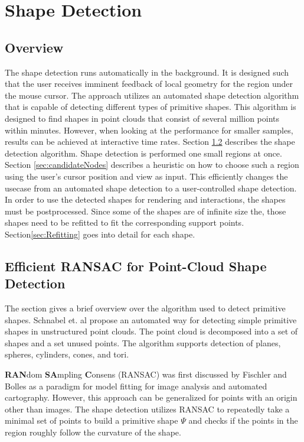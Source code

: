 \chapter{Shape Detection}
\section{Overview}
The shape detection runs automatically in the background. It is designed such that the user receives imminent feedback of local geometry for the region under the mouse cursor. The approach utilizes an automated shape detection algorithm that is capable of detecting different types of primitive shapes. This algorithm is designed to find shapes in point clouds that consist of several million points within minutes. However, when looking at the performance for smaller samples, results can be achieved at interactive time rates. 
Section \ref{sec:schnabel} describes the shape detection algorithm. 
Shape detection is performed one small regions at once. Section \ref{sec:candidateNodes} describes a heuristic on how to choose such a region using the user's cursor position and view as input. This efficiently changes the usecase from an automated shape detection to a user-controlled shape detection. 
In order to use the detected shapes for rendering and interactions, the shapes must be postprocessed. 
Since some of the shapes are of infinite size the, those shapes need to be refitted to fit the corresponding support points. Section\ref{sec:Refitting} goes into detail for each shape. 

\section{Efficient RANSAC for Point-Cloud Shape Detection}
\label{sec:schnabel}
The section gives a brief overview over the algorithm used to detect primitive shapes. 
Schnabel et. al\cite{schnabel-2007-efficient} propose an automated way for detecting simple primitive shapes in unstructured point clouds. The point cloud is decomposed into a set of shapes and a set unused points. The algorithm supports detection of planes, spheres, cylinders, cones, and tori. 

\textbf{RAN}dom \textbf{SA}mpling \textbf{C}onsens (RANSAC) was first discussed by Fischler and Bolles\cite{fischler1981random} as a paradigm for model fitting for image analysis and automated cartography. However, this approach can be generalized for points with an origin other than images. The shape detection utilizes RANSAC to repeatedly take a minimal set of points to build a primitive shape $\Psi$ and checks if the points in the region roughly follow the curvature of the shape. 

